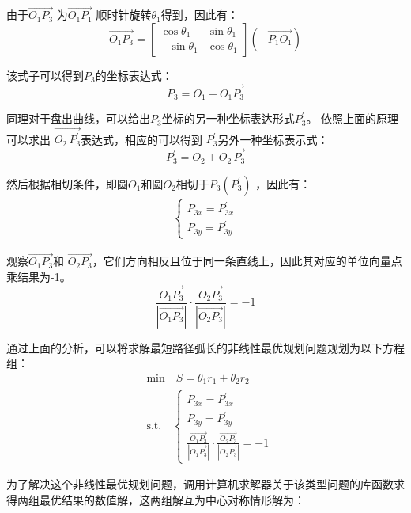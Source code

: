 \documentclass{cumcmthesis1}
\begin{document}
由于$\overrightarrow{O_1 P_3}$ 为$\overrightarrow{O_1 P_1}$
顺时针旋转$\theta_1$得到，因此有：
\begin{equation}
    \overrightarrow{O_1 P_3}=
    \begin{bmatrix}
        \cos\theta_1 & \sin\theta_1 \\
        -\sin\theta_1 & \cos\theta_1
        \end{bmatrix}
            (-\overrightarrow{ P_1 O_1})
    \end{equation}
\par
该式子可以得到$P_3$的坐标表达式：
\begin{equation}
    P_3=O_1+\overrightarrow{O_1 P_3}
\end{equation}
\par
同理对于盘出曲线，可以给出$P_3$坐标的另一种坐标表达形式$P^{\prime}_3$。
依照上面的原理可以求出
$ \overrightarrow{O_2 \, P^{\prime}_3}$表达式，相应的可以得到
$P^{\prime}_3$另外一种坐标表示式：
\begin{equation}
    P^{\prime}_3=O_2 +\overrightarrow{O_2 \, P_3}
\end{equation}
\par
然后根据相切条件，即圆$O_1$和圆$O_2$相切于$P_3(P^{\prime}_3)$
，因此有：
\begin{align}
    \begin{cases}
        P_{3x}=P^{\prime}_{3x}\\
        P_{3y}=P^{\prime}_{3y}
    \end{cases}
\end{align}
\par
观察$\overrightarrow{O_1  P_3}$和
$\overrightarrow{O_2  P_3}$，它们方向相反且位于同一条直线上，因此其对应的单位向量点乘结果为-1。
\begin{equation}
    \frac{\overrightarrow{O_1  P_3}}{|\overrightarrow{O_1  P_3}|} \cdot \frac{\overrightarrow{O_2  P_3}}{|\overrightarrow{O_2  P_3}|}=-1
\end{equation}
\par
通过上面的分析，可以将求解最短路径弧长的非线性最优规划问题规划为以下方程组：
\begin{equation} 
    \begin{aligned}
      & \text{min}\quad S=\theta_1 r_1+\theta_2 r_2\\
      & \text{s.t.} \quad
        \begin{cases}
            P_{3x}=P^{\prime}_{3x}\\
            P_{3y}=P^{\prime}_{3y}\\
            \frac{\overrightarrow{O_1  P_3}}{|\overrightarrow{O_1  P_3}|} \cdot \frac{\overrightarrow{O_2  P_3}}{|\overrightarrow{O_2  P_3}|}=-1
        \end{cases}
    \end{aligned}
  \end{equation}
\par
为了解决这个非线性最优规划问题，调用计算机求解器关于该类型问题的库函数求得两组最优结果的数值解，这两组解互为中心对称情形解为：
\end{document}
